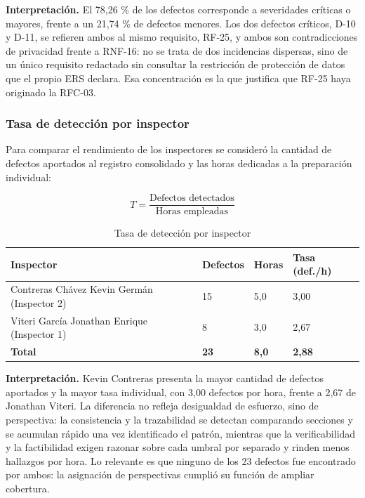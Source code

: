 \documentclass[journal,onecolumn]{IEEEtran}
\begin{document}
	\textbf{Interpretación.} El 78,26 \% de los defectos corresponde a severidades críticas o mayores,
	frente a un 21,74 \% de defectos menores. Los dos defectos críticos, D-10 y D-11, se refieren
	ambos al mismo requisito, RF-25, y ambos son contradicciones de privacidad frente a RNF-16: no se
	trata de dos incidencias dispersas, sino de un único requisito redactado sin consultar la
	restricción de protección de datos que el propio ERS declara. Esa concentración es la que justifica
	que RF-25 haya originado la RFC-03.
	
	\subsubsection{Tasa de detección por inspector}
	
	Para comparar el rendimiento de los inspectores se consideró la cantidad de defectos aportados al
	registro consolidado y las horas dedicadas a la preparación individual:
	
	\begin{equation}
		T = \frac{\text{Defectos detectados}}{\text{Horas empleadas}}
		\label{eq:tasa}
	\end{equation}
	
	\begin{table}[H]
		\centering
		\caption{Tasa de detección por inspector}
		\label{tab:tasa}
		\begin{tabular}{L{5.0cm} C{2.6cm} C{2.4cm} C{2.8cm}}
			\toprule
			\textbf{Inspector} & \textbf{Defectos} & \textbf{Horas} &
			\textbf{Tasa (def./h)} \\
			\midrule
			Contreras Chávez Kevin Germán (Inspector 2)  & 15 & 5,0 & 3,00 \\
			Viteri García Jonathan Enrique (Inspector 1) & 8  & 3,0 & 2,67 \\
			\midrule
			\textbf{Total} & \textbf{23} & \textbf{8,0} & \textbf{2,88} \\
			\bottomrule
		\end{tabular}
	\end{table}
	
	\textbf{Interpretación.} Kevin Contreras presenta la mayor cantidad de defectos aportados y la
	mayor tasa individual, con 3,00 defectos por hora, frente a 2,67 de Jonathan Viteri. La diferencia
	no refleja desigualdad de esfuerzo, sino de perspectiva: la consistencia y la trazabilidad se
	detectan comparando secciones y se acumulan rápido una vez identificado el patrón, mientras que la
	verificabilidad y la factibilidad exigen razonar sobre cada umbral por separado y rinden menos
	hallazgos por hora. Lo relevante es que ninguno de los 23 defectos fue encontrado por ambos: la
	asignación de perspectivas cumplió su función de ampliar cobertura.
	
\end{document}
